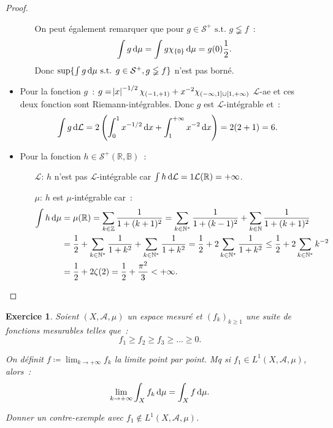\documentclass{article}
\newtheorem{ex}{Exercice}[section]
\newcommand{\pinfty}{{+\infty}}
\newcommand{\minfty}{{-\infty}}
\newcommand{\st}{\text{ s.t. }}
\newcommand{\N}{{\mathbb N}}
\newcommand{\Z}{{\mathbb Z}}
\newcommand{\R}{{\mathbb R}}
\newcommand{\B}{{\mathbb B}}
\begin{document}
\begin{proof}
\begin{itemize}
\begin{itemize}
		On peut également remarquer que pour $g \in \mathcal S^+ \st g \lneqq f$~:
		\[\int g\dif\mu = \int g\chi_{\{0\}}\dif\mu = g(0)\frac 12.\]
		Donc $\sup\{\int g\dif\mu \st g \in \mathcal S^+, g \lneqq f\}$ n'est pas borné.
	\end{itemize}
	\item Pour la fonction $g$~: $g = \abs x^{-1/2}\chi_{(-1, +1)} + x^{-2}\chi_{(\minfty, 1] \cup [1, \pinfty)}$ $\mathcal L$-ae et ces deux fonction sont Riemann-intégrables. Donc
	$g$ est $\mathcal L$-intégrable et~:
	\[\int g\dif \mathcal L = 2\left(\int_0^1x^{-1/2}\dif x + \int_1^\pinfty x^{-2}\dif x\right) = 2(2+1) = 6.\]
	\item Pour la fonction $h \in \mathcal S^+(\R, \B)$~:
	\begin{itemize}
		\item[$\mathcal L$:] $h$ n'est pas $\mathcal L$-intégrable car $\int h\dif\mathcal L = 1\mathcal L(\R) = \pinfty$.
		\item[$\mu$:]        $h$ est $\mu$-intégrable car~:
		\begin{align*}
			\int h\dif\mu &= \mu(\R) = \sum_{k \in \Z}\frac 1{1+(k+1)^2} = \sum_{k \in \N^*}\frac 1{1+(k-1)^2} + \sum_{k \in \N}\frac 1{1+(k+1)^2} \\
				&= \frac 12 + \sum_{k \in \N^*}\frac 1{1+k^2} + \sum_{k \in \N^*}\frac 1{1+k^2} = \frac 12 + 2\sum_{k \in \N^*}\frac 1{1+k^2} \leq \frac 12 + 2\sum_{k \in \N^*}k^{-2} \\
				&= \frac 12 + 2\zeta(2) = \frac 12 + \frac {\pi^2}3 < \pinfty.
		\end{align*}
	\end{itemize}
\end{itemize}
\end{proof}

\begin{ex} Soient $(X, \mathcal A, \mu)$ un espace mesuré et $(f_k)_{k \geq 1}$ une suite de fonctions mesurables telles que~:
\[f_1 \geq f_2 \geq f_3 \geq \ldots \geq 0.\]

On définit $f \coloneqq  \lim_{k \to \pinfty}f_k$ la limite point par point. Mq si $f_1 \in L^1(X, \mathcal A, \mu)$, alors~:
\[\lim_{k \to \pinfty}\int_Xf_k\dif\mu = \int_Xf\dif\mu.\]

Donner un contre-exemple avec $f_1 \not \in L^1(X, \mathcal A, \mu)$.
\end{ex}
\end{document}
